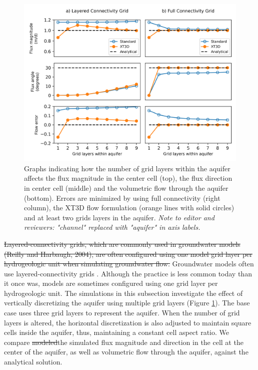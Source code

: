 \documentclass{article}
\begin{document}
\begin{figure}
	\begin{center}
	\includegraphics[scale=0.9]{../figures/fig3_paper.png}
	\caption{Graphs indicating how the number of grid layers within the aquifer affects the flux magnitude in the center cell (top), the flux direction in center cell (middle) and the volumetric flow through the aquifer (bottom). Errors are minimized by using full connectivity (right column), the XT3D flow formulation (orange lines {\color{red}with solid circles}) and at least two grids layers in the aquifer. {\color{red} \textit{Note to editor and reviewers: "channel" replaced with "aquifer" in axis labels.}}}
	\label{fig:fig3}
	\end{center}
\end{figure}

{\color{red} \sout{Layered-connectivity grids, which are commonly used in groundwater models (Reilly and Harbaugh, 2004), are often configured using one model grid layer per hydrogeologic unit when simulating groundwater flow.}
Groundwater models often use layered-connectivity grids \citep{Reilly2004}. Although the practice is less common today than it once was, models are sometimes configured using one grid layer per hydrogeologic unit.} The simulations in this subsection investigate the effect of vertically discretizing the aquifer using multiple grid layers (Figure \ref{fig:fig3}). The base case uses three grid layers to represent the aquifer. When the number of grid layers is altered, the horizontal discretization is also adjusted to maintain square cells inside the aquifer, thus, maintaining a constant cell aspect ratio. We compare {\color{red} \sout{modeled}the simulated} flux magnitude and direction in {\color{red} the} cell at the center of the aquifer, as well as volumetric flow through the aquifer, against the analytical solution.
\end{document}

